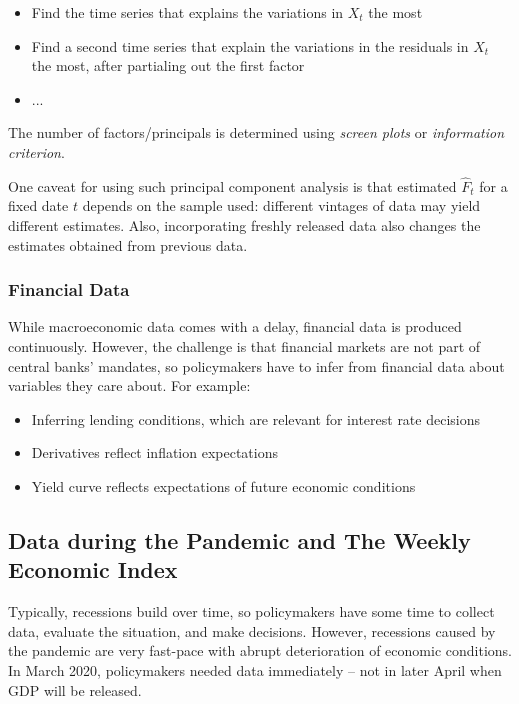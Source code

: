             \begin{itemize}
                \item Find the time series that explains the variations in $X_t$ the most
                \item Find a second time series that explain the variations in the residuals in $X_t$ the most, after partialing out the first factor
                \item ...
            \end{itemize}

            The number of factors/principals is determined using \emph{screen plots} or \emph{information criterion}.

            One caveat for using such principal component analysis is that estimated $\hat{F}_t$ for a fixed date $t$ depends on the sample used: different vintages of data may yield different estimates. Also, incorporating freshly released data also changes the estimates obtained from previous data.
             
        \subsubsection{Financial Data}

            While macroeconomic data comes with a delay, financial data is produced continuously. However, the challenge is that financial markets are not part of central banks' mandates, so policymakers have to infer from financial data about variables they care about. For example:

            \begin{itemize}
                \item Inferring lending conditions, which are relevant for interest rate decisions
                \item Derivatives reflect inflation expectations
                \item Yield curve reflects expectations of future economic conditions
            \end{itemize}

    \subsection{Data during the Pandemic and The Weekly Economic Index}\label{sec:pendamic data}

        Typically, recessions build over time, so policymakers have some time to collect data, evaluate the situation, and make decisions. However, recessions caused by the pandemic are very fast-pace with abrupt deterioration of economic conditions. In March 2020, policymakers needed data immediately -- not in later April when GDP will be released.

